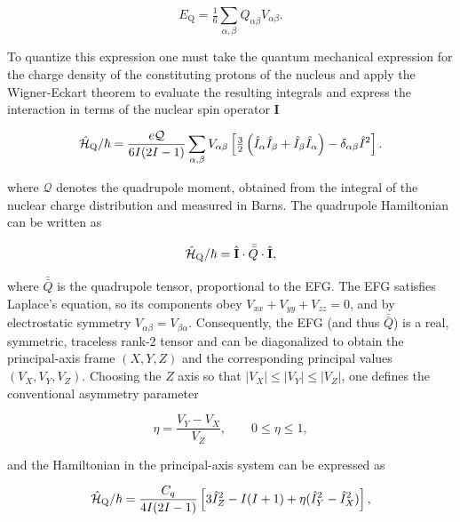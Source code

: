 \begin{equation}
    E_\text{Q} = \tfrac16 \sum_{\alpha, \beta} Q_{\alpha \beta} V_{\alpha \beta}.
\end{equation}

To quantize this expression one must take the quantum mechanical expression for the charge density of the constituting protons of the nucleus and apply the Wigner-Eckart theorem to evaluate the resulting integrals and express the interaction in terms of the nuclear spin operator $\mathbf{I}$ 

\begin{equation}
\hat{\mathcal{H}}_{\text{Q}} / \hbar = \frac{e\mathcal{Q}}{6I(2I-1)} 
\sum_{\alpha,\beta} V_{\alpha\beta} 
\left[ \tfrac{3}{2} \left( \hat{I}_{\alpha} \hat{I}_{\beta} + \hat{I}_{\beta} \hat{I}_{\alpha} \right) 
- \delta_{\alpha\beta} \hat{I}^{2} \right].
\label{eq:quadrupole}
\end{equation}

where $\mathcal{Q}$ denotes the quadrupole moment, obtained from the integral of the nuclear charge distribution and measured in Barns. The quadrupole Hamiltonian can be written as

\begin{equation}
    \hat{\mathcal{H}}_{\text{Q}} / \hbar = \hat{\mathbf{I}} \cdot \bar{\bar{Q}} \cdot \hat{\mathbf{I}},
\end{equation}

\noindent where $\bar{\bar{Q}}$ is the quadrupole tensor, proportional to the EFG. The EFG satisfies Laplace's equation, so its components obey $V_{xx}+V_{yy}+V_{zz}=0$, and by electrostatic symmetry $V_{\alpha\beta}=V_{\beta\alpha}$. Consequently, the EFG (and thus $\bar{\bar{Q}}$) is a real, symmetric, traceless rank-2 tensor and can be diagonalized to obtain the principal-axis frame $(X, Y, Z)$ and the corresponding principal values $(V_X, V_Y, V_Z)$. Choosing the $Z$ axis so that $|V_{X}|\le|V_Y|\le|V_Z|$, one defines the conventional asymmetry parameter

\begin{equation}
    \eta = \frac{V_{Y}-V_{X}}{V_{Z}}, \qquad 0\leq\eta\leq1,
\end{equation}

\noindent and the Hamiltonian in the principal-axis system can be expressed as

\begin{equation}
\hat{\mathcal{H}}_{\text{Q}} / \hbar = \frac{C_q}{4I(2I-1)}\left[ 3 \hat{I}_{Z}^2 - I(I+1) + \eta(\hat{I}_{Y}^2 - \hat{I}_{X}^2)\right],
\label{eq:quadrupole_ppaxis}
\end{equation}

